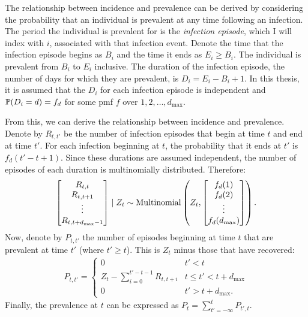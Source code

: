 \documentclass[thesis.tex]{subfiles}
\begin{document}
The relationship between incidence and prevalence can be derived by considering the probability that an individual is prevalent at any time following an infection.
The period the individual is prevalent for is the \emph{infection episode}, which I will index with $i$, associated with that infection event.
Denote the time that the infection episode begins as $B_i$ and the time it ends as $E_i \geq B_i$.
The individual is prevalent from $B_i$ to $E_i$ inclusive.
The duration of the infection episode, the number of days for which they are prevalent, is $D_i = E_i - B_i + 1$.
In this thesis, it is assumed that the $D_i$ for each infection episode is independent and $\operatorname{\mathbb{P}}(D_i = d) = f_d$ for some pmf $f$ over $1, 2, \dots, d_\text{max}$.

From this, we can derive the relationship between incidence and prevalence.
Denote by $R_{t,t'}$ be the number of infection episodes that begin at time $t$ and end at time $t'$.
For each infection beginning at $t$, the probability that it ends at $t'$ is $f_d(t' - t + 1)$.
Since these durations are assumed independent, the number of episodes of each duration is multinomially distributed.
Therefore:
\begin{align}
\begin{bmatrix}
  R_{t,t} \\ R_{t,t+1} \\ \vdots \\ R_{t,t+d_\text{max}-1}
\end{bmatrix} \mid Z_t
\sim \operatorname{Multinomial} \left(
  Z_t, 
  \begin{bmatrix}
    f_d(1) \\ f_d(2) \\ \vdots \\ f_d(d_\text{max})
  \end{bmatrix}
\right).
\end{align}
Now, denote by $P_{t,t'}$ the number of episodes beginning at time $t$ that are prevalent at time $t'$ (where $t' \geq t$).
This is $Z_t$ minus those that have recovered:
\begin{align}
    P_{t,t'} = \begin{cases}
      0 &t' < t\\
      Z_t - \sum_{i=0}^{t'-t-1} R_{t,t+i} &t \leq t' < t + d_\text{max}\\
      0 &t' > t + d_\text{max}.
  \end{cases}
\end{align}
Finally, the prevalence at $t$ can be expressed as $P_t = \sum_{t'=-\infty}^t P_{t',t}$.
\end{document}
